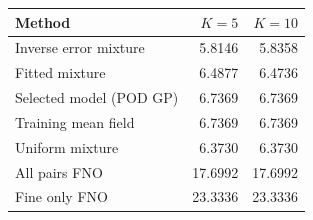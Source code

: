 \begin{tabular}{lrr}
\toprule
Method & $K=5$ & $K=10$ \\
\midrule
Inverse error mixture & 5.8146 & 5.8358 \\
Fitted mixture & 6.4877 & 6.4736 \\
Selected model (POD GP) & 6.7369 & 6.7369 \\
Training mean field & 6.7369 & 6.7369 \\
Uniform mixture & 6.3730 & 6.3730 \\
All pairs FNO & 17.6992 & 17.6992 \\
Fine only FNO & 23.3336 & 23.3336 \\
\bottomrule
\end{tabular}
